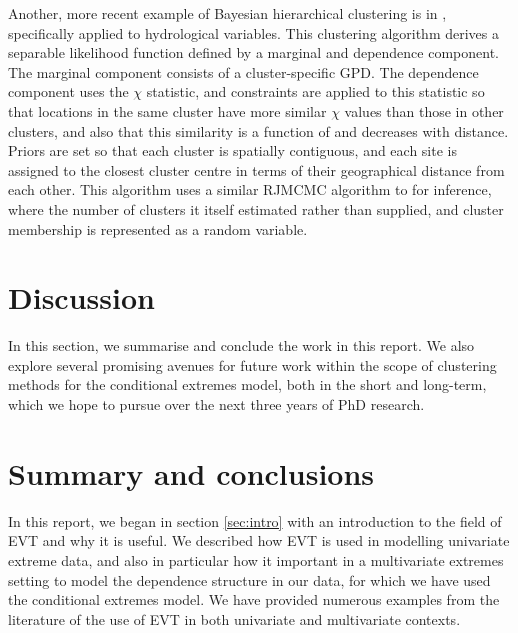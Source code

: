 \documentclass{article}
\numberwithin{equation}{section}
\begin{document}

Another, more recent example of Bayesian hierarchical clustering is in \cite{Rohrbeck2021}, specifically applied to hydrological variables. 
This clustering algorithm derives a separable likelihood function defined by a marginal and dependence component.
The marginal component consists of a cluster-specific GPD.
The dependence component uses the $\chi$ statistic, and constraints are applied to this statistic so that locations in the same cluster have more similar $\chi$ values than those in other clusters, and also that this similarity is a function of and decreases with distance.
Priors are set so that each cluster is spatially contiguous, and each site is assigned to the closest cluster centre in terms of their geographical distance from each other.
This algorithm uses a similar RJMCMC algorithm to \cite{Bottolo2003} for inference, where the number of clusters it itself estimated rather than supplied, and cluster membership is represented as a random variable. 


\newpage
\section{Discussion} \label{sec:discussion}

In this section, we summarise and conclude the work in this report. 
We also explore several promising avenues for future work within the scope of clustering methods for the conditional extremes model, both in the short and long-term, which we hope to pursue over the next three years of PhD research. 

\section{Summary and conclusions}

In this report, we began in section \ref{sec:intro} with an introduction to the field of EVT and why it is useful.
We described how EVT is used in modelling univariate extreme data, and also in particular how it important in a multivariate extremes setting to model the dependence structure in our data, for which we have used the conditional extremes model.
We have provided numerous examples from the literature of the use of EVT in both univariate and multivariate contexts. 
\end{document}
